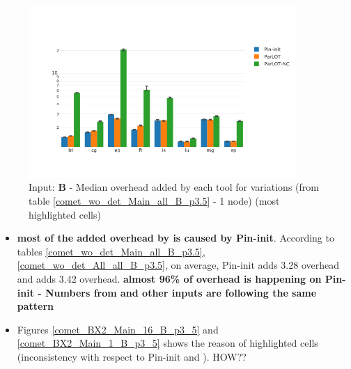 \begin{figure}[!t]
\centering
\includegraphics[width=4in]{figs.comet.newMed/comet_BX2_Main_1_B_p3_5.png}
\caption{ Input: \textbf{B} - Median overhead added by each tool for \parlotm variations (from table \ref{comet_wo_det_Main_all_B_p3.5} - 1 node) (most highlighted cells)
}
\label{comet_BX2_Main_1_B_p3_5_temp}
\end{figure}



	
	\begin{itemize}
	\item \textbf{most of the added overhead by \parlot is caused by Pin-init}. According to tables \ref{comet_wo_det_Main_all_B_p3.5}, \ref{comet_wo_det_All_all_B_p3.5}, on average, Pin-init adds 3.28 overhead and \parlota adds 3.42 overhead. \textbf{almost 96\% of \parlota overhead is happening on Pin-init - Numbers from \parlotm and other inputs are following the same pattern}
	\item Figures \ref{comet_BX2_Main_16_B_p3_5} and \ref{comet_BX2_Main_1_B_p3_5} shows the reason of highlighted cells (inconsistency with respect to Pin-init and \parlot). HOW??
	\end{itemize}




